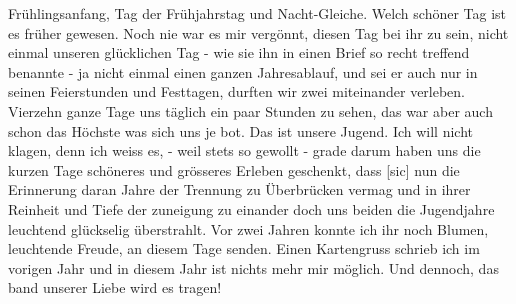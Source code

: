 \def\day{21. M\"{a}rz 1943}
\mktitle

Fr\"{u}hlingsanfang, Tag der Fr\"{u}hjahrstag und Nacht-Gleiche.
Welch sch\"{o}ner Tag ist es fr\"{u}her gewesen.
Noch nie war es mir verg\"{o}nnt, diesen Tag bei ihr zu sein, nicht einmal unseren gl\"{u}cklichen Tag - wie sie ihn in einen Brief so recht treffend benannte - ja nicht einmal einen ganzen Jahresablauf, und sei er auch nur in seinen Feierstunden und Festtagen, durften wir zwei miteinander verleben.
Vierzehn ganze Tage uns t\"{a}glich ein paar Stunden zu sehen, das war aber auch schon das H\"{o}chste was sich uns je bot.
Das ist unsere Jugend.
Ich will nicht klagen, denn ich weiss es, - weil stets so gewollt - grade darum haben uns die kurzen Tage sch\"{o}neres und gr\"{o}sseres Erleben geschenkt, dass{\color{red} [sic] } nun die Erinnerung daran Jahre der Trennung zu \"{U}berbr\"{u}cken vermag und in ihrer Reinheit und Tiefe der zuneigung zu einander doch uns beiden die Jugendjahre leuchtend gl\"{u}ckselig \"{u}berstrahlt.
Vor zwei Jahren konnte ich ihr noch Blumen, leuchtende Freude, an diesem Tage senden.
Einen Kartengruss schrieb ich im vorigen Jahr und in diesem Jahr ist nichts mehr mir m\"{o}glich.
Und dennoch, das band unserer Liebe wird es tragen!

\clearpage
